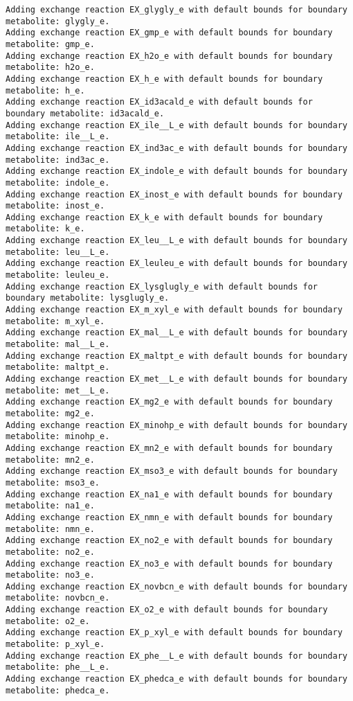 \documentclass[
  letterpaper,
  DIV=11,
  numbers=noendperiod]{scrartcl}
\begin{document}
\begin{verbatim}
Adding exchange reaction EX_glygly_e with default bounds for boundary metabolite: glygly_e.
Adding exchange reaction EX_gmp_e with default bounds for boundary metabolite: gmp_e.
Adding exchange reaction EX_h2o_e with default bounds for boundary metabolite: h2o_e.
Adding exchange reaction EX_h_e with default bounds for boundary metabolite: h_e.
Adding exchange reaction EX_id3acald_e with default bounds for boundary metabolite: id3acald_e.
Adding exchange reaction EX_ile__L_e with default bounds for boundary metabolite: ile__L_e.
Adding exchange reaction EX_ind3ac_e with default bounds for boundary metabolite: ind3ac_e.
Adding exchange reaction EX_indole_e with default bounds for boundary metabolite: indole_e.
Adding exchange reaction EX_inost_e with default bounds for boundary metabolite: inost_e.
Adding exchange reaction EX_k_e with default bounds for boundary metabolite: k_e.
Adding exchange reaction EX_leu__L_e with default bounds for boundary metabolite: leu__L_e.
Adding exchange reaction EX_leuleu_e with default bounds for boundary metabolite: leuleu_e.
Adding exchange reaction EX_lysglugly_e with default bounds for boundary metabolite: lysglugly_e.
Adding exchange reaction EX_m_xyl_e with default bounds for boundary metabolite: m_xyl_e.
Adding exchange reaction EX_mal__L_e with default bounds for boundary metabolite: mal__L_e.
Adding exchange reaction EX_maltpt_e with default bounds for boundary metabolite: maltpt_e.
Adding exchange reaction EX_met__L_e with default bounds for boundary metabolite: met__L_e.
Adding exchange reaction EX_mg2_e with default bounds for boundary metabolite: mg2_e.
Adding exchange reaction EX_minohp_e with default bounds for boundary metabolite: minohp_e.
Adding exchange reaction EX_mn2_e with default bounds for boundary metabolite: mn2_e.
Adding exchange reaction EX_mso3_e with default bounds for boundary metabolite: mso3_e.
Adding exchange reaction EX_na1_e with default bounds for boundary metabolite: na1_e.
Adding exchange reaction EX_nmn_e with default bounds for boundary metabolite: nmn_e.
Adding exchange reaction EX_no2_e with default bounds for boundary metabolite: no2_e.
Adding exchange reaction EX_no3_e with default bounds for boundary metabolite: no3_e.
Adding exchange reaction EX_novbcn_e with default bounds for boundary metabolite: novbcn_e.
Adding exchange reaction EX_o2_e with default bounds for boundary metabolite: o2_e.
Adding exchange reaction EX_p_xyl_e with default bounds for boundary metabolite: p_xyl_e.
Adding exchange reaction EX_phe__L_e with default bounds for boundary metabolite: phe__L_e.
Adding exchange reaction EX_phedca_e with default bounds for boundary metabolite: phedca_e.

\end{verbatim}
\end{document}
